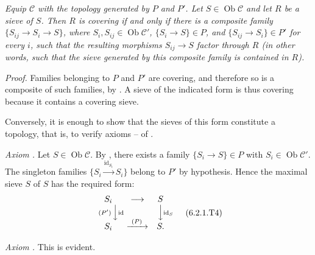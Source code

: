 \textit{Equip \(\mathscr C\) with the topology generated by \(P\) and
\(P'\). Let \(S\in\operatorname{Ob}\mathscr C\) and let \(R\) be a sieve of
\(S\). Then \(R\) is covering if and only if there is a composite family
\(\{S_{ij}\to S_i\to S\}\), where \(S_i,S_{ij}\in\operatorname{Ob}\mathscr C'\),
\(\{S_i\to S\}\in P\), and \(\{S_{ij}\to S_i\}\in P'\) for every \(i\),
such that the resulting morphisms \(S_{ij}\to S\) factor through \(R\) (in
other words, such that the sieve generated by this composite family is
contained in \(R\)).}

\smallskip
\noindent\textit{Proof.}
Families belonging to \(P\) and \(P'\) are covering, and therefore so is a
composite of such families, by . A sieve of the indicated form is
thus covering because it contains a covering sieve.

Conversely, it is enough to show that the sieves of this form constitute a
topology, that is, to verify axioms -- of .

\smallskip
\noindent\textit{Axiom .}
Let \(S\in\operatorname{Ob}\mathscr C\). By , there exists a family
\(\{S_i\to S\}\in P\) with
\(S_i\in\operatorname{Ob}\mathscr C'\). The singleton families
\(\{S_i\xrightarrow{\operatorname{id}_{S_i}}S_i\}\) belong to \(P'\) by
hypothesis. Hence the maximal sieve \(S\) of \(S\) has the required form:
\[
\begin{array}{ccc}
  S_i & \longrightarrow & S\\
  \scriptstyle(P')\,\Big\downarrow\rlap{\(\scriptstyle\operatorname{id}\)}
      & & \Big\downarrow\rlap{\(\scriptstyle\operatorname{id}_S\)}\\[-0.25em]
  S_i & \xrightarrow{\ (P)\ } & S .
\end{array}
\tag{6.2.1.T4}\label{sga3:iv:proposition:6:2:1:eq:6:2:1:t4:01}
\]

\smallskip
\noindent\textit{Axiom .}
This is evident.

